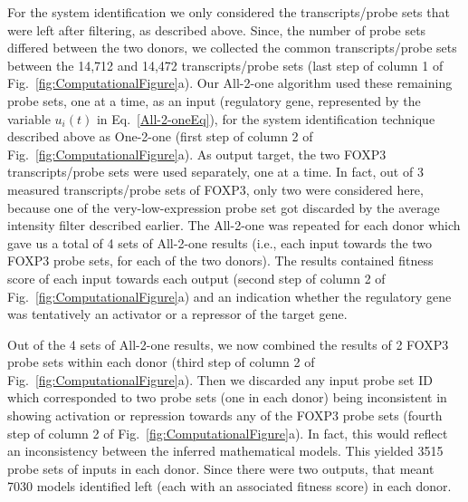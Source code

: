 \documentclass[oneside, 10pt, a4paper, twocolumn]{article}
\begin{document}
{For the system identification we only considered the transcripts/probe sets that were left after filtering, as described above. Since, the number of probe sets differed between the two donors, we collected the common transcripts/probe sets between the 14,712 and 14,472 transcripts/probe sets (last step of column 1 of Fig.~\ref{fig:ComputationalFigure}a). Our All-2-one algorithm used these remaining probe sets, one at a time, as an input (regulatory gene, represented by the variable $u_i\left( t \right)$ in Eq.~\eqref{All-2-oneEq}), for the system identification technique {described above} as One-2-one (first step of column 2 of Fig.~\ref{fig:ComputationalFigure}a). As output target, the two FOXP3 transcripts/probe sets were used separately, one at a time. In fact, out of 3 measured transcripts/probe sets of FOXP3, only two were considered here, because one of the very-low-expression probe set got discarded by the average intensity filter described earlier. The All-2-one was repeated for each donor which gave us a total of 4 sets of All-2-one results (i.e., each input towards the two FOXP3 probe sets, for each of the two donors). The results contained fitness score of each input towards each output (second step of column 2 of Fig.~\ref{fig:ComputationalFigure}a) and an indication whether the regulatory gene was tentatively an activator or a repressor of the target gene. 

Out of the 4 sets of All-2-one results, we now combined the results of 2 FOXP3 probe sets within each donor (third step of column 2 of Fig.~\ref{fig:ComputationalFigure}a). Then we discarded any input probe set ID which corresponded to two probe sets (one in each donor) being inconsistent in showing activation or repression towards any of the FOXP3 probe sets (fourth step of column 2 of Fig.~\ref{fig:ComputationalFigure}a). In fact, this would reflect an inconsistency between the inferred mathematical models. This yielded 3515 probe sets of inputs in each donor. Since there were two outputs, that meant 7030 models identified left (each with an associated fitness score) in each donor.

}
\end{document}

